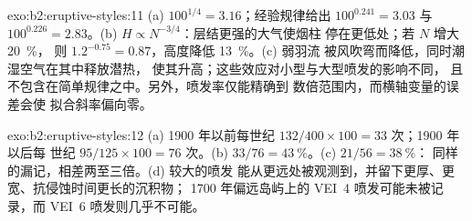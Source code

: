 \begin{solution}{exo:b2:eruptive-styles:11}
(a) $100^{1/4} = 3.16$；经验规律给出 $100^{0.241} = 3.03$ 与
$100^{0.226} = 2.83$。(b) $H \propto N^{-3/4}$：层结更强的大气使烟柱
停在更低处；若 $N$ 增大 \qty{20}{\percent}，
则 $1.2^{-0.75} = 0.87$，高度降低 \qty{13}{\percent}。(c) 弱羽流
被风吹弯而降低，同时潮湿空气在其中释放潜热，
使其升高；这些效应对小型与大型喷发的影响不同，
且不包含在简单规律之中。另外，喷发率仅能精确到
数倍范围内，而横轴变量的误差会使
拟合斜率偏向零。
\end{solution}

\begin{solution}{exo:b2:eruptive-styles:12}
(a) 1900 年以前每世纪 $132/400\times100 = 33$ 次；1900 年以后每
世纪 $95/125\times100 = 76$ 次。(b) $33/76 = \qty{43}{\percent}$。(c) $21/56 = \qty{38}{\percent}$：
同样的漏记，相差两至三倍。(d) 较大的喷发
能从更远处被观测到，并留下更厚、更宽、抗侵蚀时间更长的沉积物；
1700 年偏远岛屿上的 VEI~4 喷发可能未被记录，而
VEI~6 喷发则几乎不可能。
\end{solution}

